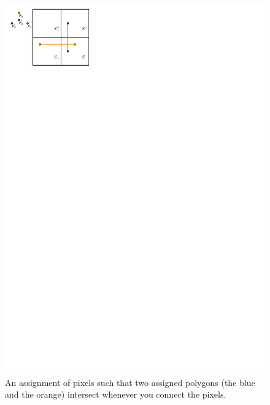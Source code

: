 \documentclass[a4paper,UKenglish,cleveref]{lipics-v2019}
\begin{document}
\begin{figure}[tb]
\centering
\includegraphics{intersection.pdf}
\caption{An assignment of pixels such that two assigned polygons (the blue and the orange) intersect whenever you connect the pixels. }
\label{fig:intersection}
\end{figure}
\end{document}
